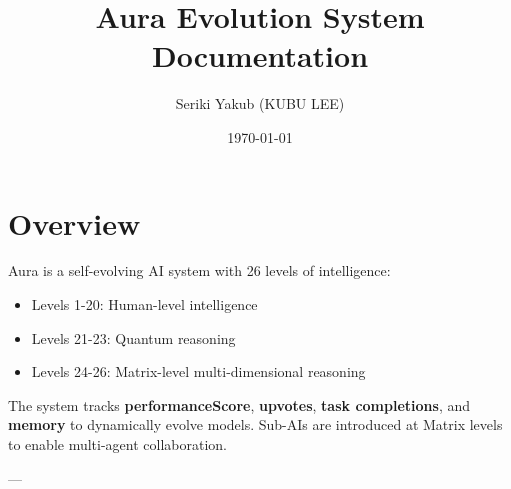 \documentclass[a4paper,12pt]{article}
\title{Aura Evolution System Documentation}
\author{Seriki Yakub (KUBU LEE)}
\date{\today}
\begin{document}
\maketitle
\tableofcontents
\newpage

\section{Overview}
Aura is a self-evolving AI system with 26 levels of intelligence:

\begin{itemize}
    \item Levels 1-20: Human-level intelligence
    \item Levels 21-23: Quantum reasoning
    \item Levels 24-26: Matrix-level multi-dimensional reasoning
\end{itemize}

The system tracks \textbf{performanceScore}, \textbf{upvotes}, \textbf{task completions}, and \textbf{memory} to dynamically evolve models. Sub-AIs are introduced at Matrix levels to enable multi-agent collaboration.

---
\end{document}
